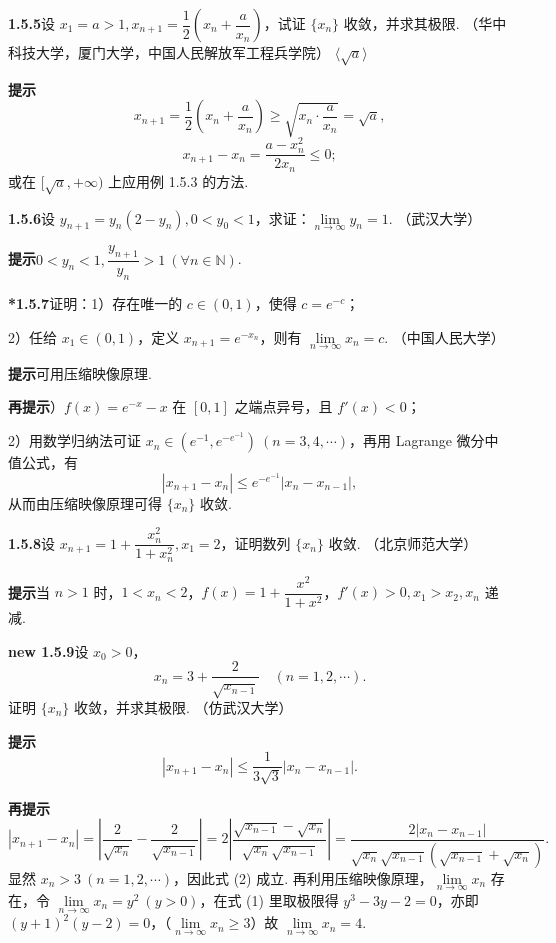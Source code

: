 \documentclass[UTF8,12pt,a4paper,fontset=fandol]{ctexart}
\begin{document}
\noindent\textbf{1.5.5}\quad 设 $x_1=a>1,x_{n+1}=\dfrac12\left(x_n+\dfrac a{x_n}\right)$，试证 $\{x_n\}$ 收敛，并求其极限. （华中科技大学，厦门大学，中国人民解放军工程兵学院） \hfill $\langle\sqrt a\rangle$

\noindent\textbf{提示}\quad
\[
  x_{n+1}=\frac12\left(x_n+\frac a{x_n}\right)\ge \sqrt{x_n\cdot \frac a{x_n}}=\sqrt a,
\]
\[
  x_{n+1}-x_n=\frac{a-x_n^2}{2x_n}\le 0;
\]
或在 $[\sqrt a,+\infty)$ 上应用例 1.5.3 的方法.

\noindent\textbf{1.5.6}\quad 设 $y_{n+1}=y_n(2-y_n),0<y_0<1$，求证：$\lim\limits_{n\to\infty}y_n=1$. （武汉大学）

\noindent\textbf{提示}\quad $0<y_n<1,\dfrac{y_{n+1}}{y_n}>1\ (\forall n\in\mathbb{N})$.

\noindent\textbf{*1.5.7}\quad 证明：1）存在唯一的 $c\in (0,1)$，使得 $c=e^{-c}$；

2）任给 $x_1\in (0,1)$，定义 $x_{n+1}=e^{-x_n}$，则有 $\lim\limits_{n\to\infty}x_n=c$. （中国人民大学）

\noindent\textbf{提示}\quad 可用压缩映像原理.

\noindent\textbf{再提示}）$f(x)=e^{-x}-x$ 在 $[0,1]$ 之端点异号，且 $f'(x)<0$；

2）用数学归纳法可证 $x_n\in (e^{-1},e^{-e^{-1}})\ (n=3,4,\cdots)$，再用 Lagrange 微分中值公式，有
\[
  |x_{n+1}-x_n|\le e^{-e^{-1}}|x_n-x_{n-1}|,
\]
从而由压缩映像原理可得 $\{x_n\}$ 收敛.

\noindent\textbf{1.5.8}\quad 设 $x_{n+1}=1+\dfrac{x_n^2}{1+x_n^2},x_1=2$，证明数列 $\{x_n\}$ 收敛. （北京师范大学）

\noindent\textbf{提示}\quad 当 $n>1$ 时，$1<x_n<2$，$f(x)=1+\dfrac{x^2}{1+x^2}$，$f'(x)>0,x_1>x_2,x_n$ 递减.

\noindent\textbf{new 1.5.9}\quad 设 $x_0>0$，
\[
  x_n=3+\frac{2}{\sqrt{x_{n-1}}}\quad (n=1,2,\cdots).
\tag{1}
\]
证明 $\{x_n\}$ 收敛，并求其极限. （仿武汉大学）

\noindent\textbf{提示}\quad
\[
  |x_{n+1}-x_n|\le \frac1{3\sqrt3}|x_n-x_{n-1}|.
\tag{2}
\]

\noindent\textbf{再提示}\quad
\[
  |x_{n+1}-x_n|
  =\left|\frac2{\sqrt{x_n}}-\frac2{\sqrt{x_{n-1}}}\right|
  =2\left|\frac{\sqrt{x_{n-1}}-\sqrt{x_n}}{\sqrt{x_n}\sqrt{x_{n-1}}}\right|
  =\frac{2|x_n-x_{n-1}|}{\sqrt{x_n}\sqrt{x_{n-1}}(\sqrt{x_{n-1}}+\sqrt{x_n})}.
\]
显然 $x_n>3\ (n=1,2,\cdots)$，因此式 (2) 成立. 再利用压缩映像原理，$\lim\limits_{n\to\infty}x_n$ 存在，令 $\lim\limits_{n\to\infty}x_n=y^2\ (y>0)$，在式 (1) 里取极限得 $y^3-3y-2=0$，亦即 $(y+1)^2(y-2)=0$，（$\lim\limits_{n\to\infty}x_n\ge 3$）故 $\lim\limits_{n\to\infty}x_n=4$.
\end{document}
